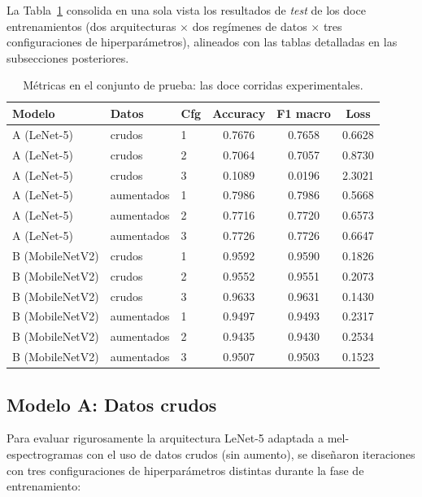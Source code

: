 \documentclass[conference]{IEEEtran}
\begin{document}
La Tabla~\ref{tab:doce_runs} consolida en una sola vista los resultados de \textit{test} de los doce entrenamientos (dos arquitecturas $\times$ dos regímenes de datos $\times$ tres configuraciones de hiperparámetros), alineados con las tablas detalladas en las subsecciones posteriores.

\begin{table}[t]
\caption{Métricas en el conjunto de prueba: las doce corridas experimentales.}
\label{tab:doce_runs}
\centering
{\footnotesize
\begin{tabular}{@{}lllccc@{}}
\toprule
\textbf{Modelo} & \textbf{Datos} & \textbf{Cfg} & \textbf{Accuracy} & \textbf{F1 macro} & \textbf{Loss} \\
\midrule
A (LeNet-5) & crudos & 1 & 0.7676 & 0.7658 & 0.6628 \\
A (LeNet-5) & crudos & 2 & 0.7064 & 0.7057 & 0.8730 \\
A (LeNet-5) & crudos & 3 & 0.1089 & 0.0196 & 2.3021 \\
A (LeNet-5) & aumentados & 1 & 0.7986 & 0.7986 & 0.5668 \\
A (LeNet-5) & aumentados & 2 & 0.7716 & 0.7720 & 0.6573 \\
A (LeNet-5) & aumentados & 3 & 0.7726 & 0.7726 & 0.6647 \\
B (MobileNetV2) & crudos & 1 & 0.9592 & 0.9590 & 0.1826 \\
B (MobileNetV2) & crudos & 2 & 0.9552 & 0.9551 & 0.2073 \\
B (MobileNetV2) & crudos & 3 & 0.9633 & 0.9631 & 0.1430 \\
B (MobileNetV2) & aumentados & 1 & 0.9497 & 0.9493 & 0.2317 \\
B (MobileNetV2) & aumentados & 2 & 0.9435 & 0.9430 & 0.2534 \\
B (MobileNetV2) & aumentados & 3 & 0.9507 & 0.9503 & 0.1523 \\
\bottomrule
\end{tabular}
}
\end{table}

\subsection{Modelo A: Datos crudos}

Para evaluar rigurosamente la arquitectura LeNet-5 adaptada a mel-espectrogramas con el uso de datos crudos (sin aumento), se diseñaron iteraciones con tres configuraciones de hiperparámetros distintas durante la fase de entrenamiento:
\end{document}
